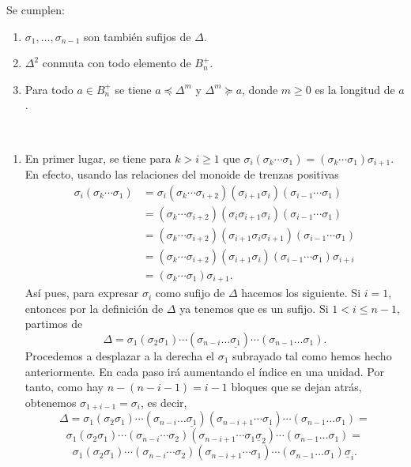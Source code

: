 \documentclass[bibtex, anon]{TEMat-article}
\begin{document}
\begin{proposicion}\label{sufijos} Se cumplen:
	\begin{enumerate}
		\item $\sigma_1,\dots,\sigma_{n-1}$ son también sufijos de $\Delta$.
		\item $\Delta^2$ conmuta con todo elemento de $B_n^+$.
		\item Para todo $a\in B_n^+$ se tiene $a\preccurlyeq\Delta^m$ y $\Delta^m\succcurlyeq a$, donde  $m\geq 0$ es la longitud de $a$.
	\end{enumerate}
	
\end{proposicion}

\begin{demostracion}\
	\begin{enumerate}
		\item En primer lugar, se tiene para $k>i\geq 1$ que $\sigma_i(\sigma_k\cdots\sigma_1)=(\sigma_k\cdots\sigma_1)\sigma_{i+1}$. En efecto, usando las relaciones del monoide de trenzas positivas
		\begin{align*}
		\sigma_i(\sigma_k\cdots\sigma_1)&=\sigma_i(\sigma_k\cdots\sigma_{i+2})(\sigma_{i+1}\sigma_i)(\sigma_{i-1}\cdots\sigma_1)\\
		&=(\sigma_k\cdots\sigma_{i+2})(\sigma_i\sigma_{i+1}\sigma_i)(\sigma_{i-1}\cdots\sigma_1)\\
		&=(\sigma_k\cdots\sigma_{i+2})(\sigma_{i+1}\sigma_i\sigma_{i+1})(\sigma_{i-1}\cdots\sigma_1)\\
		&=(\sigma_k\cdots\sigma_{i+2})(\sigma_{i+1}\sigma_i)(\sigma_{i-1}\cdots\sigma_1)\sigma_{i+i}\\
		&=(\sigma_k\cdots\sigma_1)\sigma_{i+1}.
		\end{align*}
		Así pues, para expresar $\sigma_i$ como sufijo de $\Delta$ hacemos los siguiente. Si $i=1$, entonces por la definición de $\Delta$ ya tenemos que es un sufijo. Si $1<i\leq n-1$, partimos de
		\[
		\Delta=\sigma_1(\sigma_2\sigma_1)\cdots(\sigma_{n-i}\dots\underline{\sigma_1})\cdots(\sigma_{n-1}\dots\sigma_1).
		\]
		Procedemos a desplazar a la derecha el $\sigma_1$ subrayado tal como hemos hecho anteriormente. En cada paso irá aumentando el índice en una unidad. Por tanto, como hay $n-(n-i-1)=i-1$ bloques que se dejan atrás, obtenemos $\sigma_{1+i-1}=\sigma_i$, es decir,
		\[
		\Delta=\sigma_1(\sigma_2\sigma_1)\cdots(\sigma_{n-i}\dots\underline{\sigma_1})(\sigma_{n-i+1}\cdots\sigma_1)\cdots(\sigma_{n-1}\dots\sigma_1)=
		\]
		\[
		\sigma_1(\sigma_2\sigma_1)\cdots(\sigma_{n-i}\cdots\sigma_2)(\sigma_{n-i+1}\cdots\sigma_1\underline{\sigma}_2)\cdots(\sigma_{n-1}\dots\sigma_1)=
		\]
		\[
		\sigma_1(\sigma_2\sigma_1)\cdots(\sigma_{n-i}\cdots\sigma_2)(\sigma_{n-i+1}\cdots\sigma_1)\cdots(\sigma_{n-1}\dots\sigma_1)\underline{\sigma}_i.
		\]
		

\end{enumerate}
\end{demostracion}
\end{document}
